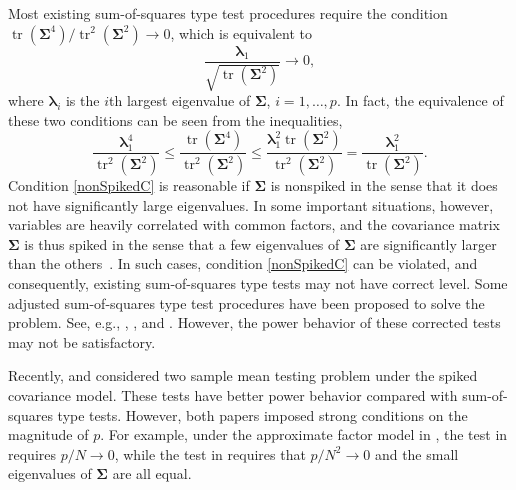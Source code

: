 \documentclass[12pt]{article} %
\DeclareMathOperator{\mytr}{tr}
\newcommand{\bfsym}[1]{\ensuremath{\boldsymbol{#1}}}
\def\blambda {\bfsym {\lambda}}
\def\bSigma {\bfsym {\Sigma}}
\theoremstyle{definition}
\begin{document}

Most existing sum-of-squares type test procedures require the condition  $\mytr(\bSigma^4)/\mytr^2(\bSigma^2)\to 0$, which is equivalent to
\begin{equation}\label{nonSpikedC}
    \frac{\blambda_1}{\sqrt{\mytr(\bSigma^2)}}\to 0,
\end{equation}
where $\blambda_i$ is the $i$th largest eigenvalue of $\bSigma$, $i=1,\ldots, p$.
In fact, the equivalence of these two conditions can be seen from the inequalities,
\begin{equation*}
    \frac{\blambda_1^4}{\mytr^2(\bSigma^2)} 
    \leq
    \frac{\mytr(\bSigma^4)}{\mytr^2(\bSigma^2)}
    \leq
    \frac{\blambda_1^2 \mytr(\bSigma^2)}{\mytr^2(\bSigma^2)}
    =\frac{\blambda_1^2}{\mytr(\bSigma^2)}.
\end{equation*}
Condition \eqref{nonSpikedC} is reasonable if $\bSigma$ is nonspiked in the sense that it does not have significantly large eigenvalues.
In some important situations, however, variables are heavily correlated with common factors, and the covariance matrix $\bSigma$ is thus spiked in the sense that a few eigenvalues of $\bSigma$ are significantly larger than the others~\citep{Fan2013Large,Cai2015Optimal,wang2017As}.
In such cases, condition \eqref{nonSpikedC} can be violated, and consequently, existing sum-of-squares type tests may not have correct level.
Some adjusted sum-of-squares type test procedures have been proposed to solve the problem.
See, e.g.,
\cite{Katayama2013Asymptotic}, \cite{Ma2015A}, \cite{ZHANG2017200} and \cite{WANG2018}.
However, the power behavior of these corrected tests may not be satisfactory.


Recently, \cite{Aoshima2018} and \cite{WANG2018225} considered two sample mean testing problem under the spiked covariance model.
These tests have better power behavior compared with sum-of-squares type tests.
However, both papers imposed strong conditions on the magnitude of $p$.
For example, under the approximate factor model in \cite{Fan2013Large}, the test in \cite{Aoshima2018} requires $p/N \to 0$, while the test in \cite{WANG2018225} requires that $p/N^2\to 0$ and the small eigenvalues of $\bSigma$ are all equal.
\end{document}
